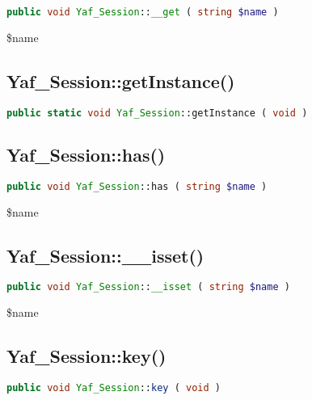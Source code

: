 \begin{lstlisting}[language=PHP]
public void Yaf_Session::__get ( string $name )
\end{lstlisting}

\begin{compactitem}
\item \$name
\end{compactitem}

\subsection{Yaf\_Session::getInstance()}


\begin{lstlisting}[language=PHP]
public static void Yaf_Session::getInstance ( void )
\end{lstlisting}

\subsection{Yaf\_Session::has()}



\begin{lstlisting}[language=PHP]
public void Yaf_Session::has ( string $name )
\end{lstlisting}

\begin{compactitem}
\item \$name
\end{compactitem}



\subsection{Yaf\_Session::\_\_isset()}



\begin{lstlisting}[language=PHP]
public void Yaf_Session::__isset ( string $name )
\end{lstlisting}

\begin{compactitem}
\item \$name
\end{compactitem}

\subsection{Yaf\_Session::key()}


\begin{lstlisting}[language=PHP]
public void Yaf_Session::key ( void )
\end{lstlisting}



